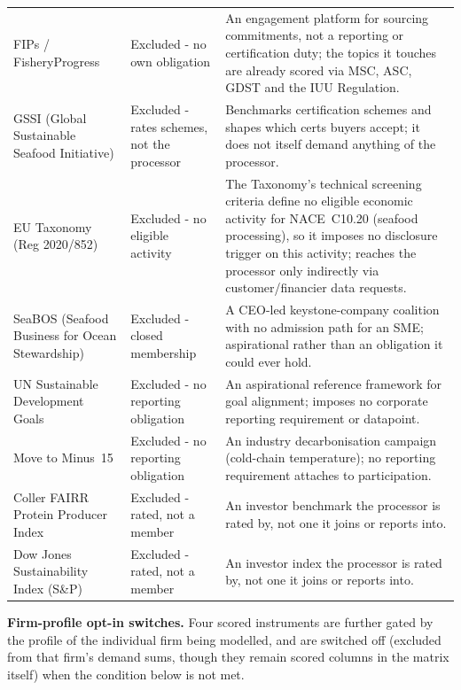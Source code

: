 \documentclass[
]{article}
\begin{document}
\begin{longtable}{@{}p{2.7cm}p{2.3cm}p{6.5cm}@{}}
FIPs / FisheryProgress & Excluded - no own obligation & An engagement platform for sourcing commitments, not a reporting or certification duty; the topics it touches are already scored via MSC, ASC, GDST and the IUU Regulation. \\
GSSI (Global Sustainable Seafood Initiative) & Excluded - rates schemes, not the processor & Benchmarks certification schemes and shapes which certs buyers accept; it does not itself demand anything of the processor. \\
EU Taxonomy (Reg 2020/852) & Excluded - no eligible activity & The Taxonomy's technical screening criteria define no eligible economic activity for NACE~C10.20 (seafood processing), so it imposes no disclosure trigger on this activity; reaches the processor only indirectly via customer/financier data requests. \\
SeaBOS (Seafood Business for Ocean Stewardship) & Excluded - closed membership & A CEO-led keystone-company coalition with no admission path for an SME; aspirational rather than an obligation it could ever hold. \\
UN Sustainable Development Goals & Excluded - no reporting obligation & An aspirational reference framework for goal alignment; imposes no corporate reporting requirement or datapoint. \\
Move to Minus~15 & Excluded - no reporting obligation & An industry decarbonisation campaign (cold-chain temperature); no reporting requirement attaches to participation. \\
Coller FAIRR Protein Producer Index & Excluded - rated, not a member & An investor benchmark the processor is rated by, not one it joins or reports into. \\
Dow Jones Sustainability Index (S\&P) & Excluded - rated, not a member & An investor index the processor is rated by, not one it joins or reports into. \\
\end{longtable}

\textbf{Firm-profile opt-in switches.} Four scored instruments are further
gated by the profile of the individual firm being modelled, and are switched
off (excluded from that firm's demand sums, though they remain scored
columns in the matrix itself) when the condition below is not met.
\end{document}

